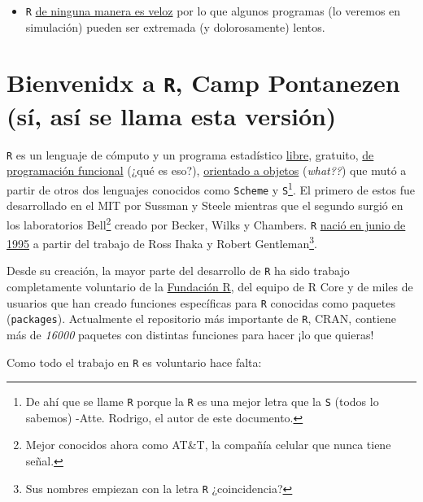 \documentclass[
]{book}
\providecommand{\tightlist}{%
  \setlength{\itemsep}{0pt}\setlength{\parskip}{0pt}}
\begin{document}
\begin{itemize}
\tightlist
\item
  \texttt{R} \href{https://github.com/matthieugomez/benchmark-stata-r}{de ninguna manera es veloz} por lo que algunos programas (lo veremos en simulación) pueden ser extremada (y dolorosamente) lentos.
\end{itemize}

\hypertarget{bienvenidx-a-r-camp-pontanezen-suxed-asuxed-se-llama-esta-versiuxf3n}{%
\section{\texorpdfstring{Bienvenidx a \texttt{R}, Camp Pontanezen (sí, así se llama esta versión)}{Bienvenidx a R, Camp Pontanezen (sí, así se llama esta versión)}}\label{bienvenidx-a-r-camp-pontanezen-suxed-asuxed-se-llama-esta-versiuxf3n}}

\texttt{R} es un lenguaje de cómputo y un programa estadístico \href{https://www.gnu.org/philosophy/free-sw.html}{libre}, gratuito, \href{http://adv-r.had.co.nz/Functional-programming.html}{de programación funcional} (¿qué es eso?), \href{https://en.wikipedia.org/wiki/Object-oriented_programming}{orientado a objetos} (\emph{what??}) que mutó a partir de otros dos lenguajes conocidos como \texttt{Scheme} y \texttt{S}\footnote{De ahí que se llame \texttt{R} porque la \texttt{R} es una mejor letra que la \texttt{S} (todos lo sabemos)
  -Atte. Rodrigo, el autor de este documento.}. El primero de estos fue desarrollado en el MIT por Sussman y Steele mientras que el segundo surgió en los laboratorios Bell\footnote{Mejor conocidos ahora como AT\&T, la compañía celular que nunca tiene señal.} creado por Becker, Wilks y Chambers. \texttt{R} \href{https://cran.r-project.org/doc/html/interface98-paper/paper_2.html}{nació en junio de 1995} a partir del trabajo de Ross Ihaka y Robert Gentleman\footnote{Sus nombres empiezan con la letra \texttt{R} ¿coincidencia?}.

Desde su creación, la mayor parte del desarrollo de \texttt{R} ha sido trabajo completamente voluntario de la \href{https://www.r-project.org/foundation/}{Fundación R}, del equipo de R Core y de miles de usuarios que han creado funciones específicas para \texttt{R} conocidas como paquetes (\texttt{packages}). Actualmente el repositorio más importante de \texttt{R}, CRAN, contiene más de \emph{16000} paquetes con distintas funciones para hacer ¡lo que quieras!

Como todo el trabajo en \texttt{R} es voluntario hace falta:
\end{document}
